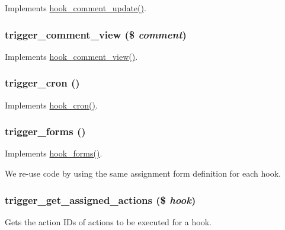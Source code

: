 \label{trigger_8module_a816f11378edc4880420922ae9fc63474}
Implements \hyperlink{group__hooks_ga63e0b41e7dbaadbf352b0a9c246d5ae5}{hook\_\-comment\_\-update()}. \hypertarget{trigger_8module_a6d08bf541ce68a761ffb4b430f83f195}{
\subsubsection[{trigger\_\-comment\_\-view}]{\setlength{\rightskip}{0pt plus 5cm}trigger\_\-comment\_\-view (\$ {\em comment})}}
\label{trigger_8module_a6d08bf541ce68a761ffb4b430f83f195}
Implements \hyperlink{group__hooks_gab162cbd3dc1b0395011df47ca3f98aa3}{hook\_\-comment\_\-view()}. \hypertarget{trigger_8module_a61f5a9a5793885927dbebc05e5420647}{
\subsubsection[{trigger\_\-cron}]{\setlength{\rightskip}{0pt plus 5cm}trigger\_\-cron ()}}
\label{trigger_8module_a61f5a9a5793885927dbebc05e5420647}
Implements \hyperlink{group__hooks_gaf07f1e3d98112fc2ba6920cf7ee6fb16}{hook\_\-cron()}. \hypertarget{trigger_8module_abd865128c4ce28a35e58a19a9bf30fb9}{
\subsubsection[{trigger\_\-forms}]{\setlength{\rightskip}{0pt plus 5cm}trigger\_\-forms ()}}
\label{trigger_8module_abd865128c4ce28a35e58a19a9bf30fb9}
Implements \hyperlink{group__hooks_gaa764fee74b85797f75c0c923cad628d5}{hook\_\-forms()}.

We re-\/use code by using the same assignment form definition for each hook. \hypertarget{trigger_8module_a1d52e4ba7b5602e21b75ebe6be90ebc3}{
\subsubsection[{trigger\_\-get\_\-assigned\_\-actions}]{\setlength{\rightskip}{0pt plus 5cm}trigger\_\-get\_\-assigned\_\-actions (\$ {\em hook})}}
\label{trigger_8module_a1d52e4ba7b5602e21b75ebe6be90ebc3}
Gets the action IDs of actions to be executed for a hook.


